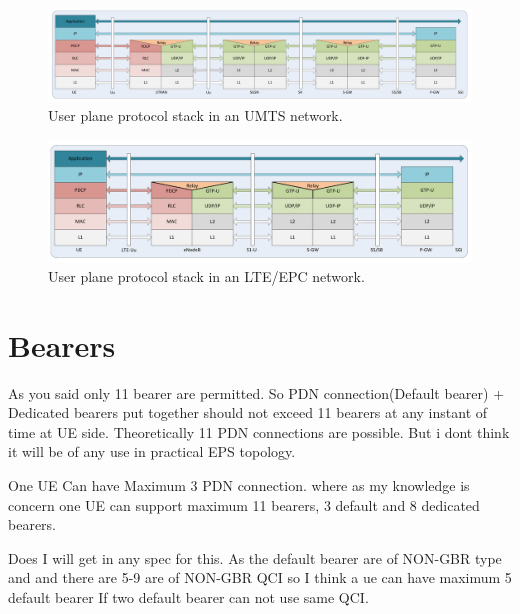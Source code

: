 \begin{figure}[htbp]
	\centering
	\includegraphics[width=1.2\textwidth]{images/3g-userplane.pdf}
	\caption{User plane protocol stack in an UMTS network.}
	\label{c4:fig:3gpp-umtsuserplane}
\end{figure}

\begin{figure}[htbp]
	\centering
	\includegraphics[width=1.2\textwidth]{images/LTE-userplane.pdf}
	\caption{User plane protocol stack in an LTE/EPC network.}
	\label{c4:fig:3gpp-lteuserplane}
\end{figure}


\section{Bearers}

As you said only 11 bearer are permitted.
So PDN connection(Default bearer) + Dedicated bearers put together should not exceed 11 bearers at any instant of time at UE side.
Theoretically 11 PDN connections are possible. But i dont think it will be of any use in practical EPS topology.

One UE Can have Maximum 3 PDN connection.
where as my knowledge is concern one UE can support maximum 11 bearers, 3 default and 8 dedicated bearers.

Does I will get in any spec for this. As the default bearer are of  NON-GBR type and and there are 5-9 are of NON-GBR QCI so I think a ue can have maximum 5 default bearer If two default bearer can not use same QCI.

